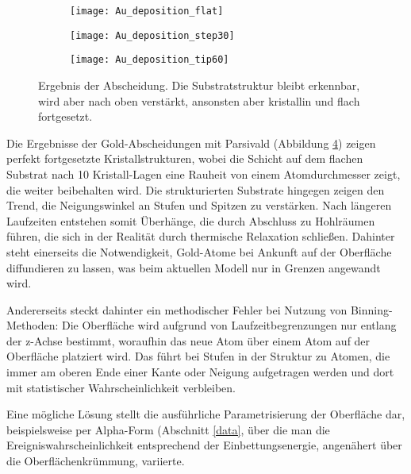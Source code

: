 \begin{figure}[bt]
  \captionsetup[subfigure]{singlelinecheck=false}
  \def\subfigwidth{0.31\textwidth}
  \begin{subfigure}[t]{\subfigwidth}
    \texttt{[image: Au\_deposition\_flat]}
    \label{fig:goldsubstrate-a}
  \end{subfigure}
  \hfill
  \begin{subfigure}[t]{\subfigwidth}
    \texttt{[image: Au\_deposition\_step30]}
    \label{fig:goldsubstrate-a}
  \end{subfigure}
  \hfill
  \begin{subfigure}[t]{\subfigwidth}
    \texttt{[image: Au\_deposition\_tip60]}
    \label{fig:goldsubstrate-a}
  \end{subfigure}
  \caption[Abscheidung auf strukturierten Substraten]{
    Ergebnis der Abscheidung.
    Die Substratstruktur bleibt erkennbar, wird aber nach oben verstärkt, ansonsten aber kristallin und flach fortgesetzt.
  }
  \label{fig:golddepositions}
\end{figure}

Die Ergebnisse der Gold-Abscheidungen mit Parsivald (Abbildung \ref{fig:golddepositions}) zeigen perfekt fortgesetzte Kristallstrukturen, wobei die Schicht auf dem flachen Substrat nach 10 Kristall-Lagen eine Rauheit von einem Atomdurchmesser zeigt, die weiter beibehalten wird.
Die strukturierten Substrate hingegen zeigen den Trend, die Neigungswinkel an Stufen und Spitzen zu verstärken.
Nach längeren Laufzeiten entstehen somit Überhänge, die durch Abschluss zu Hohlräumen führen, die sich in der Realität durch thermische Relaxation schließen.
Dahinter steht einerseits die Notwendigkeit, Gold-Atome bei Ankunft auf der Oberfläche diffundieren zu lassen, was beim aktuellen Modell nur in Grenzen angewandt wird.

Andererseits steckt dahinter ein methodischer Fehler bei Nutzung von Binning-Methoden:
Die Oberfläche wird aufgrund von Laufzeitbegrenzungen nur entlang der z-Achse bestimmt, woraufhin das neue Atom über einem Atom auf der Oberfläche platziert wird.
Das führt bei Stufen in der Struktur zu Atomen, die immer am oberen Ende einer Kante oder Neigung aufgetragen werden und dort mit statistischer Wahrscheinlichkeit verbleiben.

Eine mögliche Lösung stellt die ausführliche Parametrisierung der Oberfläche dar, beispielsweise per Alpha-Form (Abschnitt \ref{data}, über die man die Ereigniswahrscheinlichkeit entsprechend der Einbettungsenergie, angenähert über die Oberflächenkrümmung, variierte.
